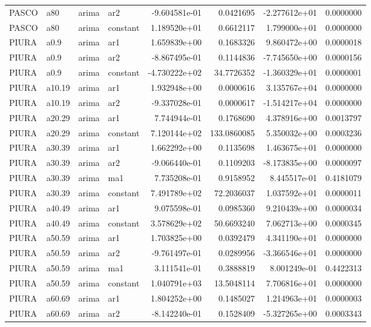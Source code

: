 \documentclass[
]{article}
\begin{document}
\begin{table}[!h]
\begin{tabular}[t]{llllrrrr}
PASCO & a80 & arima & ar2 & -9.604581e-01 & 0.0421695 & -2.277612e+01 & 0.0000000\\
PASCO & a80 & arima & constant & 1.189520e+01 & 0.6612117 & 1.799000e+01 & 0.0000000\\
\addlinespace
PIURA & a0.9 & arima & ar1 & 1.659839e+00 & 0.1683326 & 9.860472e+00 & 0.0000018\\
PIURA & a0.9 & arima & ar2 & -8.867495e-01 & 0.1144836 & -7.745650e+00 & 0.0000156\\
PIURA & a0.9 & arima & constant & -4.730222e+02 & 34.7726352 & -1.360329e+01 & 0.0000001\\
PIURA & a10.19 & arima & ar1 & 1.932948e+00 & 0.0000616 & 3.135767e+04 & 0.0000000\\
PIURA & a10.19 & arima & ar2 & -9.337028e-01 & 0.0000617 & -1.514217e+04 & 0.0000000\\
\addlinespace
PIURA & a20.29 & arima & ar1 & 7.744944e-01 & 0.1768690 & 4.378916e+00 & 0.0013797\\
PIURA & a20.29 & arima & constant & 7.120144e+02 & 133.0860085 & 5.350032e+00 & 0.0003236\\
PIURA & a30.39 & arima & ar1 & 1.662292e+00 & 0.1135698 & 1.463675e+01 & 0.0000000\\
PIURA & a30.39 & arima & ar2 & -9.066440e-01 & 0.1109203 & -8.173835e+00 & 0.0000097\\
PIURA & a30.39 & arima & ma1 & 7.735208e-01 & 0.9158952 & 8.445517e-01 & 0.4181079\\
\addlinespace
PIURA & a30.39 & arima & constant & 7.491789e+02 & 72.2036037 & 1.037592e+01 & 0.0000011\\
PIURA & a40.49 & arima & ar1 & 9.075598e-01 & 0.0985360 & 9.210439e+00 & 0.0000034\\
PIURA & a40.49 & arima & constant & 3.578629e+02 & 50.6693240 & 7.062713e+00 & 0.0000345\\
PIURA & a50.59 & arima & ar1 & 1.703825e+00 & 0.0392479 & 4.341190e+01 & 0.0000000\\
PIURA & a50.59 & arima & ar2 & -9.761497e-01 & 0.0289956 & -3.366546e+01 & 0.0000000\\
\addlinespace
PIURA & a50.59 & arima & ma1 & 3.111541e-01 & 0.3888819 & 8.001249e-01 & 0.4422313\\
PIURA & a50.59 & arima & constant & 1.040791e+03 & 13.5048114 & 7.706816e+01 & 0.0000000\\
PIURA & a60.69 & arima & ar1 & 1.804252e+00 & 0.1485027 & 1.214963e+01 & 0.0000003\\
PIURA & a60.69 & arima & ar2 & -8.142240e-01 & 0.1528409 & -5.327265e+00 & 0.0003343\\

\end{tabular}
\end{table}
\end{document}
